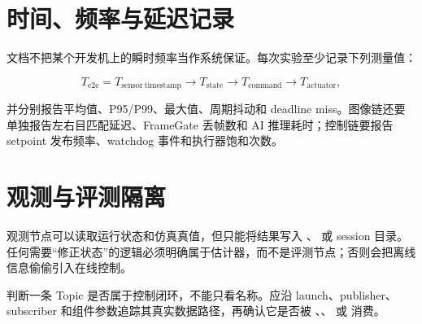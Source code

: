 \section{时间、频率与延迟记录}
文档不把某个开发机上的瞬时频率当作系统保证。每次实验至少记录下列测量值：

\begin{equation}
  T_{\mathrm{e2e}} = T_{\mathrm{sensor\ timestamp}} \rightarrow
  T_{\mathrm{state}} \rightarrow T_{\mathrm{command}} \rightarrow
  T_{\mathrm{actuator}},
\end{equation}

并分别报告平均值、P95/P99、最大值、周期抖动和 deadline miss。图像链还要单独报告左右目匹配延迟、FrameGate 丢帧数和 AI 推理耗时；控制链要报告 setpoint 发布频率、watchdog 事件和执行器饱和次数。

\section{观测与评测隔离}
观测节点可以读取运行状态和仿真真值，但只能将结果写入 、 或 session 目录。任何需要“修正状态”的逻辑必须明确属于估计器，而不是评测节点；否则会把离线信息偷偷引入在线控制。

\begin{infobox}
判断一条 Topic 是否属于控制闭环，不能只看名称。应沿 launch、publisher、subscriber 和组件参数追踪其真实数据路径，再确认它是否被 、、 或  消费。
\end{infobox}
